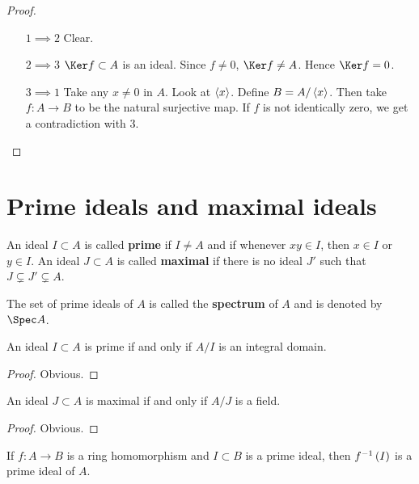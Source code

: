 \begin{proof}
\hfill
\begin{itemize}[leftmargin=0.5in]
\item[$ 1 \implies 2 $] Clear.
\item[$ 2 \implies 3 $] $ \Ker f \subset A $ is an ideal. Since $ f \ne 0 $, $ \Ker f \ne A $. Hence $ \Ker f = 0 $.
\item[$ 3 \implies 1 $] Take any $ x \ne 0 $ in $ A $. Look at $ \left\langle x \right\rangle $. Define $ B = A / \left\langle x \right\rangle $. Then take $ f : A \to B $ to be the natural surjective map. If $ f $ is not identically zero, we get a contradiction with $ 3 $.
\end{itemize}
\end{proof}

\pagebreak

\section{Prime ideals and maximal ideals}

\begin{definition}
An ideal $ I \subset A $ is called \textbf{prime} if $ I \ne A $ and if whenever $ xy \in I $, then $ x \in I $ or $ y \in I $. An ideal $ J \subset A $ is called \textbf{maximal} if there is no ideal $ J' $ such that $ J \subsetneq J' \subsetneq A $.
\end{definition}

\begin{notation*}
The set of prime ideals of $ A $ is called the \textbf{spectrum} of $ A $ and is denoted by $ \Spec A $.
\end{notation*}

\begin{lemma}
An ideal $ I \subset A $ is prime if and only if $ A / I $ is an integral domain.
\end{lemma}

\begin{proof}
Obvious.
\end{proof}

\begin{lemma}
An ideal $ J \subset A $ is maximal if and only if $ A / J $ is a field.
\end{lemma}

\begin{proof}
Obvious.
\end{proof}

\begin{proposition}
If $ f : A \to B $ is a ring homomorphism and $ I \subset B $ is a prime ideal, then $ f^{-1}\br{I} $ is a prime ideal of $ A $.
\end{proposition}

